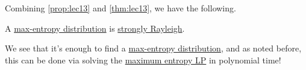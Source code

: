 Combining \autoref{prop:lec13} and \autoref{thm:lec13}, we have the following.

\begin{corollary}
	A \hyperref[def:max-entropy-distribution]{max-entropy distribution} is \hyperref[def:strongly-Rayleigh-distribution]{strongly Rayleigh}.
\end{corollary}

We see that it's enough to find a \hyperref[def:max-entropy-distribution]{max-entropy distribution}, and as noted before, this can be done via solving the \hyperref[eq:max-entropy]{maximum entropy LP} in polynomial time!